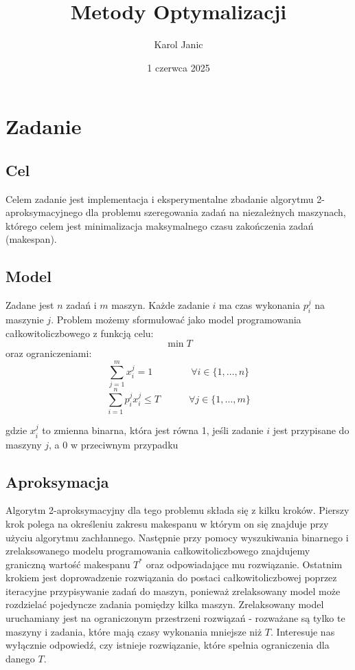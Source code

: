 \documentclass{article}
\title{Metody Optymalizacji}
\author{Karol Janic}
\date{1 czerwca 2025}
\begin{document}
\begin{titlingpage}
    \maketitle
\end{titlingpage}

\tableofcontents

\newpage

\section{Zadanie}
\subsection{Cel}
Celem zadanie jest implementacja i eksperymentalne zbadanie algorytmu 2-aproksymacyjnego dla problemu szeregowania zadań na niezależnych maszynach,
którego celem jest minimalizacja maksymalnego czasu zakończenia zadań (makespan).

\subsection{Model}
Zadane jest $n$ zadań i $m$ maszyn. Każde zadanie $i$ ma czas wykonania $p_i^j$ na maszynie $j$. 
Problem możemy sformułować jako model programowania całkowitoliczbowego z funkcją celu:
\begin{equation}
    \min T
\end{equation}
oraz ograniczeniami:
\begin{equation}
    \sum_{j=1}^{m} x_i^j = 1 \quad \quad \qquad \forall i \in \{1, \ldots, n\}
\end{equation}
\begin{equation}
    \sum_{i=1}^{n} p_i^j x_i^j \leq T \quad \quad \quad \forall j \in \{1, \ldots, m\}
\end{equation}

gdzie $x_i^j$ to zmienna binarna, która jest równa 1, jeśli zadanie $i$ jest przypisane do maszyny $j$, a 0 w przeciwnym przypadku

\subsection{Aproksymacja}
Algorytm 2-aproksymacyjny dla tego problemu składa się z kilku kroków. Pierszy krok polega na określeniu zakresu makespanu w którym on się znajduje przy użyciu algorytmu zachłannego. 
Następnie przy pomocy wyszukiwania binarnego i zrelaksowanego modelu programowania całkowitoliczbowego znajdujemy graniczną wartość makespanu $T^*$ oraz odpowiadające mu rozwiązanie.
Ostatnim krokiem jest doprowadzenie rozwiązania do postaci całkowitoliczbowej poprzez iteracyjne przypisywanie zadań do maszyn, ponieważ zrelaksowany model może rozdzielać pojedyncze zadania pomiędzy kilka maszyn.
Zrelaksowany model uruchamiany jest na ograniczonym przestrzeni rozwiązań - rozważane są tylko te maszyny i zadania, które mają czasy wykonania mniejsze niż $T$. Interesuje nas wyłącznie odpowiedź, czy istnieje rozwiązanie, które spełnia ograniczenia dla danego $T$.
\end{document}
